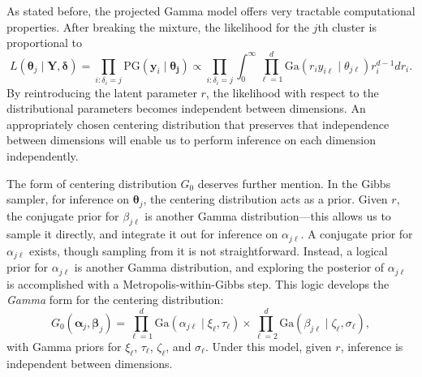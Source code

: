 As stated before, the projected Gamma model offers very tractable computational properties.  After breaking the mixture, the likelihood for the $j$th cluster is proportional to
\begin{equation}
    \label{eqn:pglikelihood}
    L(\bm{\theta}_j\mid \bm{Y},\bm{\delta}) = \prod_{i:\delta_i = j}\text{PG}\left(\bm{y}_i\mid \bm{\theta_j}\right) \propto \prod_{i:\delta_i = j}\int_0^{\infty}\prod_{\ell = 1}^d\text{Ga}\left(r_iy_{i\ell}\mid\theta_{j\ell}\right)r_i^{d-1}dr_i.
\end{equation}
By reintroducing the latent parameter $r$, the likelihood with respect to the distributional parameters becomes independent between dimensions.  An appropriately chosen centering distribution that preserves that independence between dimensions will enable us to perform inference on each dimension independently.

The form of centering distribution $G_0$ deserves further mention.  In the Gibbs sampler, for inference on $\bm{\theta}_j$, the centering distribution acts as a prior.  Given $r$, the conjugate prior for $\beta_{j\ell}$ is another Gamma distribution---this allows us to sample it directly, and integrate it out for inference on $\alpha_{j\ell}$.  A conjugate prior for $\alpha_{j\ell}$ exists, though sampling from it is not straightforward.  Instead, a logical prior for $\alpha_{j\ell}$ is another Gamma distribution, and exploring the posterior of $\alpha_{j\ell}$ is accomplished with a Metropolis-within-Gibbs step.  This logic develops the \emph{Gamma} form for the centering distribution:
\begin{equation*}
    G_0(\bm{\alpha}_j,\bm{\beta}_j) =
    \prod_{\ell = 1}^d\text{Ga}\left(\alpha_{j\ell}\mid\xi_\ell,\tau_\ell\right) \times \prod_{\ell = 2}^d\text{Ga}\left(\beta_{j\ell}\mid\zeta_\ell,\sigma_\ell\right),
\end{equation*}
with Gamma priors for $\xi_\ell$, $\tau_\ell$, $\zeta_\ell$, and $\sigma_\ell$.  Under this model, given $r$, inference is independent between dimensions.

